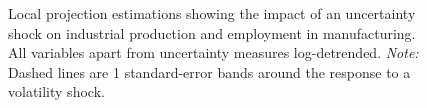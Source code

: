\documentclass[a4paper,11pt,listof=nochaptergap,oneside,pointednumbers,bibtotoc,bigheadings,liststotoc]{scrbook}
\theoremstyle{mysatz}
\theoremstyle{mydefinition}
\theoremstyle{mybemerkung}
\begin{document}
\begin{figure}[!h]
   \centering
   \setlength\fboxsep{0pt}
   \setlength\fboxrule{0pt}
      \caption[Local projection estimations showing the impact of an uncertainty shock on industrial production and employment in manufacturing. All variables apart from uncertainty measures log-detrended.]{Local projection estimations showing the impact of an uncertainty shock on industrial production and employment in manufacturing. All variables apart from uncertainty measures log-detrended.
      \textit{Note:} Dashed lines are 1 standard-error bands around the response to a volatility shock.}
   \label{fig:locproj_plot_all_HP_until2008}
\end{figure}
\end{document}

